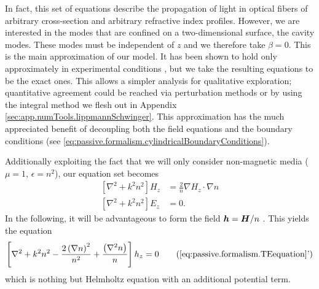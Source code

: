 
In fact, this set of equations describe the propagation of light 
in optical fibers of arbitrary cross-section and arbitrary
refractive index profiles. However, we are interested in the modes
that are confined on a two-dimensional surface, the cavity modes. 
These modes must be independent of $z$ and we therefore take 
$\beta=0$. This is the main approximation of our model. It has been shown
to hold only approximately in experimental conditions \cite{DUB2008,BIT2010}, 
but we take the resulting equations to be the exact ones. This allows a 
simpler analysis for qualitative exploration; quantitative agreement
could be reached via perturbation methods or by using the integral method
we flesh out in Appendix \ref{sec:app.numTools.lippmannSchwinger}. This approximation 
has the much appreciated benefit of decoupling both the field
equations and the boundary conditions (see \eqref{eq:passive.formalism.cylindricalBoundaryConditions}).

Additionally exploiting the fact that we will only consider
non-magnetic media ($\mu=1$, $\epsilon=n^2$), our equation set becomes
  \begin{subequations}
  \label{eq:passive.formalism.fieldEquations}
  \begin{align}
    \left[\nabla^2+k^2n^2\right] H_z	&= \frac{2}{n}\nabla H_z\cdot\nabla n	\label{eq:passive.formalism.TEequation}\\
    \left[\nabla^2+k^2n^2\right] E_z	&= 0. 
  \end{align}
  \end{subequations}
In the following, it will be advantageous to form the field
$\boldsymbol{h}=\boldsymbol{H}/n$ \cite{DET2009}. This yields the equation
\cite{DET2009, GAP2013a}
  \begin{equation}
   \left[\nabla^2+k^2n^2-\frac{2\left(\nabla n\right)^2}{n^2}+\frac{\left(\nabla^2n\right)}{n}\right]h_z=0 \tag{\ref{eq:passive.formalism.TEequation}'}
   \label{eq:passive.formalism.TEequationPrime}
  \end{equation}
which is nothing but Helmholtz equation with an additional potential term.

